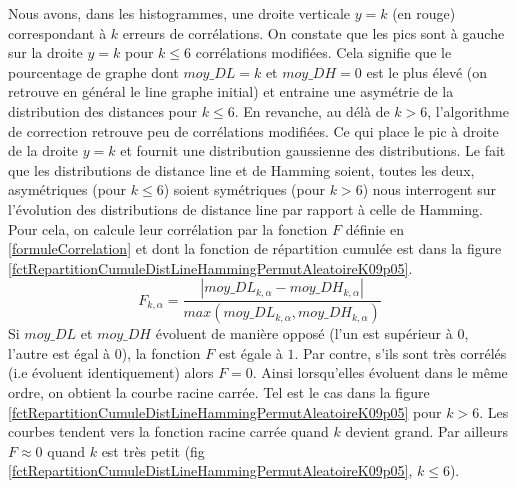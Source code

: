 \documentclass[onecolumn, 12pt]{book}
\begin{document}
\newline
Nous avons, dans les histogrammes, une droite verticale $y = k$ (en rouge) correspondant \`a $k$ erreurs de corr\'elations.
On constate que les pics sont \`a gauche sur la droite $y = k$ pour $k \le 6$ corr\'elations modifi\'ees.
Cela signifie que le pourcentage de graphe dont $moy\_DL = k$  et $moy\_DH=0$ est le plus \'elev\'e (on retrouve en g\'en\'eral le line graphe initial) et entraine une asym\'etrie de la distribution des distances pour $k \le 6$.
En revanche, au d\'el\`a de $k>6$, l'algorithme de correction retrouve peu de corr\'elations modifi\'ees. Ce qui place le pic \`a droite de la droite $y = k$ et fournit une distribution gaussienne des distributions. \newline
Le fait que les distributions de distance line et de Hamming soient, toutes les deux, asym\'etriques (pour $k \le 6$) soient sym\'etriques (pour $k>6$) nous interrogent sur l'\'evolution des distributions de distance line par rapport \`a celle de Hamming. 
 Pour cela, on calcule leur corr\'elation par la fonction $F$ d\'efinie en \ref{formuleCorrelation} et dont la fonction de r\'epartition cumul\'ee est dans la figure \ref{fctRepartitionCumuleDistLineHammingPermutAleatoireK09p05}.
\begin{equation}
\label{formuleCorrelation}
F_{k, \alpha} = \frac{ | moy\_DL_{k, \alpha} - moy\_DH_{k, \alpha} | }{ max(moy\_DL_{k, \alpha},  moy\_DH_{k, \alpha}) }
\end{equation}
Si $moy\_DL$ et $moy\_DH$ \'evoluent de mani\`ere oppos\'e (l'un est sup\'erieur \`a $0$, l'autre est \'egal \`a $0$), la fonction $F$ est \'egale \`a $1$. Par contre, s'ils sont tr\`es corr\'el\'es (i.e \'evoluent identiquement) alors $F = 0$.
Ainsi lorsqu'elles \'evoluent dans le m\^eme ordre, on obtient la courbe racine carr\'ee. Tel est le cas dans la figure \ref{fctRepartitionCumuleDistLineHammingPermutAleatoireK09p05} pour $k > 6$. 
Les courbes tendent vers la fonction racine carr\'ee quand $k$ devient grand. 
Par ailleurs $F \approx 0$ quand $k$ est tr\`es petit (fig \ref{fctRepartitionCumuleDistLineHammingPermutAleatoireK09p05}, $k \le 6$).
\newline
\end{document}
